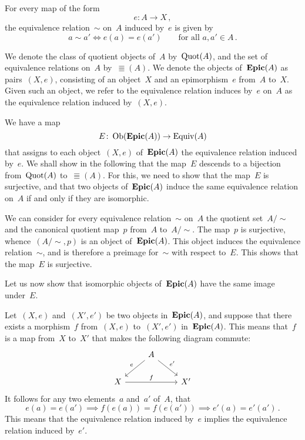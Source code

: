 \subsection{}



\subsubsection{}

\begin{recall}
	For every map of the form
	\[
		e \colon A \to X \,,
	\]
	the equivalence relation~$∼$ on~$A$ induced by~$e$ is given by
	\[
		a ∼ a'
		\iff
		e(a) = e(a')
		\qquad
		\text{for all~$a, a' ∈ A$} \,.
	\]
\end{recall}

We denote the class of quotient objects of~$A$ by~$\operatorname{Quot}(A)$, and the set of equivalence relations on~$A$ by~$\Equiv(A)$.
We denote the objects of~$\mathbf{Epic}(A)$ as pairs~$(X, e)$, consisting of an object~$X$ and an epimorphism~$e$ from~$A$ to~$X$.
Given such an object, we refer to the equivalence relation induces by~$e$ on~$A$ as the equivalence relation induced by~$(X, e)$.

We have a map
\[
	E \colon \operatorname{Ob}(\mathbf{Epic}(A)) \to \operatorname{Equiv}(A)
\]
that assigns to each object~$(X, e)$ of~$\mathbf{Epic}(A)$ the equivalence relation induced by~$e$.
We shall show in the following that the map~$E$ descends to a bijection from~$\operatorname{Quot}(A)$ to~$\Equiv(A)$.
For this, we need to show that the map~$E$ is surjective, and that two objects of~$\mathbf{Epic}(A)$ induce the same equivalence relation on~$A$ if and only if they are isomorphic.

We can consider for every equivalence relation~$∼$ on~$A$ the quotient set~$A / {∼}$ and the canonical quotient map~$p$ from~$A$ to~$A / {∼}$.
The map~$p$ is surjective, whence~$(A / {∼}, p)$ is an object of~$\mathbf{Epic}(A)$.
This object induces the equivalence relation~$∼$, and is therefore a preimage for~$∼$ with respect to~$E$.
This shows that the map~$E$ is surjective.

Let us now show that isomorphic objects of~$\mathbf{Epic}(A)$ have the same image under~$E$.

Let~$(X, e)$ and~$(X', e')$ be two objects in~$\mathbf{Epic}(A)$, and suppose that there exists a morphism~$f$ from~$(X, e)$ to~$(X', e')$ in~$\mathbf{Epic}(A)$.
This means that~$f$ is a map from~$X$ to~$X'$ that makes the following diagram commute:
\[
	\begin{tikzcd}[column sep = normal]
		{}
		&
		A
		\arrow{dl}[above left]{e}
		\arrow{dr}[above right]{e'}
		&
		{}
		\\
		X
		\arrow{rr}[above]{f}
		&
		{}
		&
		X'
	\end{tikzcd}
\]
It follows for any two elements~$a$ and~$a'$ of~$A$, that
\[
	e(a) = e(a')
	\implies
	f(e(a)) = f(e(a'))
	\implies
	e'(a) = e'(a') \,.
\]
This means that the equivalence relation induced by~$e$ implies the equivalence relation induced by~$e'$.

